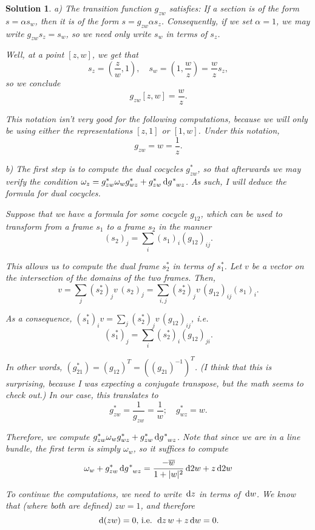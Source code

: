 \documentclass{article}
\theoremstyle{nonumberplain}
\newtheorem{sol}{Solution}
\DeclarePairedDelimiter{\abs}{\lvert}{\rvert}
\begin{document}
\begin{sol}
a) The transition function $g_{zw}$ satisfies: If a section is of the form $s = \alpha s_w$, then it is of the form $s = g_{zw} \alpha s_z$. Consequently, if we set $\alpha = 1$, we may write $g_{zw} s_z = s_w$, so we need only write $s_w$ in terms of $s_z$.

Well, at a point $[z,w]$, we get that
\[s_z = (\frac zw, 1), \quad s_w = (1,\frac wz) = \frac wz s_z,\]
so we conclude
\[g_{zw}[z,w] = \frac wz.\]

This notation isn't very good for the following computations, because we will only be using either the representations $[z,1]$ or $[1,w]$. Under this notation,
\[g_{zw} = w = \frac1z.\]

\medskip

b) The first step is to compute the dual cocycles $g_{zw}^*$, so that afterwards we may verify the condition $\omega_z = g^*_{zw} \omega_w g^*_{wz} + g^*_{zw} \dl g^*_{wz}$. As such, I will deduce the formula for dual cocycles.

Suppose that we have a formula for some cocycle $g_{12}$, which can be used to transform from a frame $s_1$ to a frame $s_2$ in the manner
\[(s_2)_j = \sum_i (s_1)_i (g_{12})_{ij}.\]

This allows us to compute the dual frame $s_2^*$ in terms of $s_1^*$. Let $v$ be a vector on the intersection of the domains of the two frames. Then,
\[v = \sum_j (s_2^*)_j v \, (s_2)_j = \sum_{i,j} (s_2^*)_j v \, (g_{12})_{ij} (s_1)_i.\]

As a consequence, $(s_1^*)_i v = \sum_j (s_2^*)_j v \, (g_{12})_{ij}$, i.e.
\[(s_1^*)_j = \sum_i (s_2^*)_i (g_{12})_{ji}.\]

In other words, $(g_{21}^*) = (g_{12})^T = ((g_{21})^{-1})^T$. (I think that this is surprising, because I was expecting a conjugate transpose, but the math seems to check out.) In our case, this translates to
\[g_{zw}^* = \frac1{g_{zw}} = \frac 1w; \quad g_{wz}^* = w.\]

Therefore, we compute $g^*_{zw} \omega_w g^*_{wz} + g^*_{zw} \dl g^*_{wz}$. Note that since we are in a line bundle, the first term is simply $\omega_w$, so it suffices to compute
\begin{equation*}
\omega_w + g^*_{zw} \dl g^*_{wz} = \frac{-\overline{w}}{1+\abs{w}^2} \dl2 w + z \dl2 w
\end{equation*}

To continue the computations, we need to write $\dl z$ in terms of $\dl w$. We know that (where both are defined) $zw = 1$, and therefore
\[\dl(zw) = 0\text{, i.e. } \dl z \, w + z \dl w = 0.\]


\end{sol}
\end{document}
